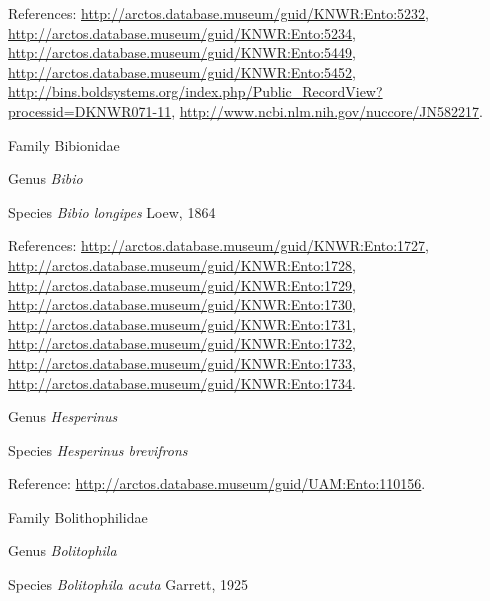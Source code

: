 \documentclass[9pt, article]{memoir}
\begin{document}
\begin{multicols}{2}
\vspace{6pt}References: 
\url{http://arctos.database.museum/guid/KNWR:Ento:5232}, 
\url{http://arctos.database.museum/guid/KNWR:Ento:5234}, 
\url{http://arctos.database.museum/guid/KNWR:Ento:5449}, 
\url{http://arctos.database.museum/guid/KNWR:Ento:5452}, 
\url{http://bins.boldsystems.org/index.php/Public_RecordView?processid=DKNWR071-11}, 
\url{http://www.ncbi.nlm.nih.gov/nuccore/JN582217}.

\vspace{6pt}\noindent\hspace{24pt}Family Bibionidae


\vspace{6pt}\noindent\hspace{30pt}Genus \textit{Bibio}


\vspace{6pt}\noindent\hspace{36pt}Species \textit{Bibio longipes} Loew, 1864


\vspace{6pt}References: 
\url{http://arctos.database.museum/guid/KNWR:Ento:1727}, 
\url{http://arctos.database.museum/guid/KNWR:Ento:1728}, 
\url{http://arctos.database.museum/guid/KNWR:Ento:1729}, 
\url{http://arctos.database.museum/guid/KNWR:Ento:1730}, 
\url{http://arctos.database.museum/guid/KNWR:Ento:1731}, 
\url{http://arctos.database.museum/guid/KNWR:Ento:1732}, 
\url{http://arctos.database.museum/guid/KNWR:Ento:1733}, 
\url{http://arctos.database.museum/guid/KNWR:Ento:1734}.

\vspace{6pt}\noindent\hspace{30pt}Genus \textit{Hesperinus}


\vspace{6pt}\noindent\hspace{36pt}Species \textit{Hesperinus brevifrons}


\vspace{6pt}Reference: 
\url{http://arctos.database.museum/guid/UAM:Ento:110156}.

\vspace{6pt}\noindent\hspace{24pt}Family Bolithophilidae


\vspace{6pt}\noindent\hspace{30pt}Genus \textit{Bolitophila}


\vspace{6pt}\noindent\hspace{36pt}Species \textit{Bolitophila acuta} Garrett, 1925



\end{multicols}
\end{document}
